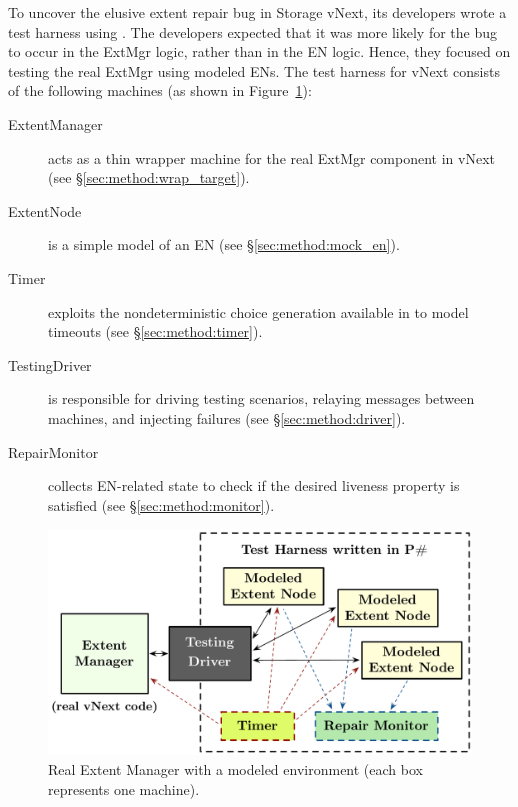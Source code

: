 To uncover the elusive extent repair bug in \Azure Storage vNext, its developers wrote a test harness using \psharp. The developers expected that it was more likely for the bug to occur in the ExtMgr logic, rather than in the EN logic. Hence, they focused on testing the real ExtMgr using modeled ENs. The test harness for vNext consists of the following \psharp machines (as shown in Figure~\ref{fig:azurestoremodel}):
\begin{description}
\item[ExtentManager] acts as a thin wrapper machine for the real ExtMgr component in vNext (see \S\ref{sec:method:wrap_target}).

\item[ExtentNode] is a simple model of an EN (see \S\ref{sec:method:mock_en}).

\item[Timer] exploits the nondeterministic choice generation available in \psharp to model timeouts (see \S\ref{sec:method:timer}).

\item[TestingDriver] is responsible for driving testing scenarios, relaying messages between machines, and injecting failures (see \S\ref{sec:method:driver}).

\item[RepairMonitor] collects EN-related state to check if the desired liveness property is satisfied (see \S\ref{sec:method:monitor}).
\end{description}

\begin{figure}[t]
\centering
\includegraphics[width=\linewidth]{img/mocked_vnext}
\caption{Real Extent Manager with a modeled environment (each box represents one \psharp machine).}
\label{fig:azurestoremodel}
\vspace{-2mm}
\end{figure}

